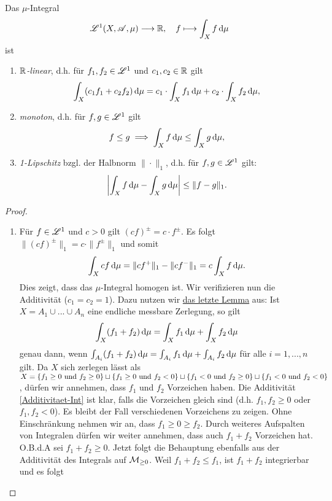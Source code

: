 \begin{satz}
\begin{mdframed}
Das $\mu$-Integral
\begin{equation*}
\mathscr{L}^1(X,\mathscr{A},\mu)  \longrightarrow  \mathbb{R}, \quad
f  \longmapsto  \int_X f \, \mathrm{d} \mu
\end{equation*}
ist
\begin{enumerate}
\item \emph{$\mathbb{R}$-linear}, d.h. für $f_1,f_2 \in \mathscr{L}^1$ und $c_1,c_2\in\mathbb{R}$ gilt
$$\int_X (c_1f_1+c_2f_2)\, \mathrm{d}\mu = c_1\cdot \int_X f_1\, \mathrm{d}\mu+c_2\cdot \int_X f_2 \, \mathrm{d}\mu,$$
\item \emph{monoton}, d.h. für $f,g\in\mathscr{L}^1$ gilt
$$f\leq g \implies \int_X f \, \mathrm{d}\mu \leq \int_X g\, \mathrm{d}\mu,$$
\item \emph{1-Lipschitz} bzgl. der Halbnorm $\|\cdot \|_1$, d.h. für $f,g\in\mathscr{L}^1$ gilt:
$$\left| \int_X f\, \mathrm{d} \mu-\int_X g\, \mathrm{d} \mu \right|\leq \|f-g\|_1.$$
\end{enumerate}
\end{mdframed}
\begin{proof}
\begin{enumerate}
\item Für $f\in \mathscr{L}^1$ und $c>0$ gilt $(cf)^\pm=c\cdot f^\pm$. Es folgt $\|(cf)^\pm\|_1=c\cdot \|f^\pm\|_1$ und somit
$$\int_X cf\, \mathrm{d}\mu = \|cf^+\|_1-\|cf^-\|_1 = c\int_Xf\, \mathrm{d}\mu.$$
Dies zeigt, dass das $\mu$-Integral homogen ist. Wir verifizieren nun die Additivität ($c_1=c_2=1$). Dazu nutzen wir \hyperref[integral-zerlegung]{das letzte Lemma} aus: Ist $X=A_1\cup...\cup A_n$ eine endliche messbare Zerlegung, so gilt
\begin{equation}\label{Additivitaet-Int}
\int_X(f_1+f_2)\, \mathrm{d}\mu =\int_X f_1\, \mathrm{d}\mu+\int_X f_2\, \mathrm{d}\mu
\end{equation}
genau dann, wenn $\int_{A_i}(f_1+f_2)\, \mathrm{d}\mu =\int_{A_i} f_1\, \mathrm{d}\mu+\int_{A_i} f_2\, \mathrm{d}\mu$ für alle $i=1,...,n$ gilt. Da $X$ sich zerlegen lässt als $X=\{f_1\geq 0 \text{ und } f_2\geq 0\} \sqcup \{f_1\geq 0 \text{ und } f_2 < 0\} \sqcup \{f_1< 0 \text{ und } f_2\geq 0\} \sqcup \{f_1 < 0 \text{ und } f_2 < 0\}$, dürfen wir annehmen, dass $f_1$ und $f_2$ Vorzeichen haben. Die Additivität \eqref{Additivitaet-Int} ist klar, falls die Vorzeichen gleich sind (d.h. $f_1,f_2\geq 0$ oder $f_1,f_2 <0$). Es bleibt der Fall verschiedenen Vorzeichens zu zeigen. Ohne Einschränkung nehmen wir an, dass $f_1 \geq 0 \geq f_2$. Durch weiteres Aufspalten von Integralen dürfen wir weiter annehmen, dass auch $f_1+f_2$ Vorzeichen hat. O.B.d.A sei $f_1+f_2\geq 0$. Jetzt folgt die Behauptung ebenfalls aus der Additivität des Integrals auf $\mathcal{M}_{\geq 0}$. Weil $f_1+f_2\leq f_1$, ist $f_1+f_2$ integrierbar und es folgt

\end{enumerate}
\end{proof}
\end{satz}
